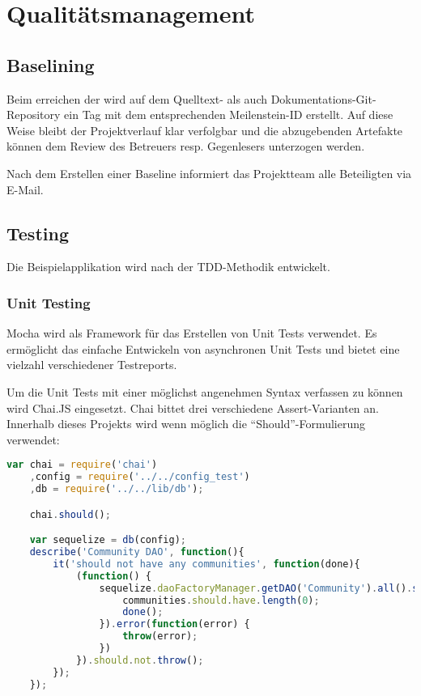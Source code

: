 \chapter{Qualitätsmanagement}
\label{sec:qualitymanagement}

\section{Baselining}
Beim erreichen der  wird auf dem Quelltext- als auch Dokumentations-Git-Repository ein Tag mit dem entsprechenden Meilenstein-ID erstellt. Auf diese Weise bleibt der Projektverlauf klar verfolgbar und die abzugebenden Artefakte können dem Review des Betreuers resp. Gegenlesers unterzogen werden.

Nach dem Erstellen einer Baseline informiert das Projektteam alle Beteiligten via E-Mail.

\section{Testing}
Die Beispielapplikation wird nach der \gls{TDD}-Methodik entwickelt.

\subsection{Unit Testing}
Mocha \cite{Mocha} wird als Framework für das Erstellen von Unit Tests verwendet. Es ermöglicht das einfache Entwickeln von asynchronen Unit Tests und bietet eine vielzahl verschiedener Testreports.

Um die Unit Tests mit einer möglichst angenehmen Syntax verfassen zu können wird Chai.JS \cite{ChaiJS} eingesetzt. Chai bittet drei verschiedene Assert-Varianten an. Innerhalb dieses Projekts wird wenn möglich die ``Should''-Formulierung verwendet:

\begin{lstlisting}[language=JavaScript, caption=Beispiel eines Unit Tests mit Mocha und Chai.js]
var chai = require('chai')
	,config = require('../../config_test')
	,db = require('../../lib/db');

	chai.should();

	var sequelize = db(config);
	describe('Community DAO', function(){
		it('should not have any communities', function(done){
			(function() {
				sequelize.daoFactoryManager.getDAO('Community').all().success(function(communities) {
					communities.should.have.length(0);
					done();
				}).error(function(error) {
					throw(error);
				})
			}).should.not.throw();
		});
	});
\end{lstlisting}

